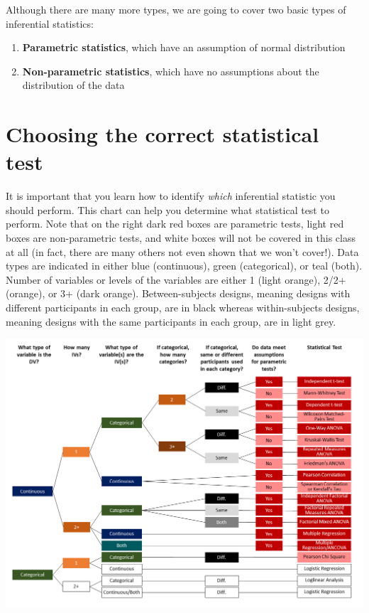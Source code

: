 \documentclass[
]{book}
\providecommand{\tightlist}{%
  \setlength{\itemsep}{0pt}\setlength{\parskip}{0pt}}
\begin{document}
Although there are many more types, we are going to cover two basic types of inferential statistics:

\begin{enumerate}
\def\labelenumi{\arabic{enumi}.}
\tightlist
\item
  \textbf{Parametric statistics}, which have an assumption of normal distribution
\item
  \textbf{Non-parametric statistics}, which have no assumptions about the distribution of the data
\end{enumerate}

\hypertarget{choosing-the-correct-statistical-test}{%
\section{Choosing the correct statistical test}\label{choosing-the-correct-statistical-test}}

It is important that you learn how to identify \emph{which} inferential statistic you should perform. This chart can help you determine what statistical test to perform. Note that on the right dark red boxes are parametric tests, light red boxes are non-parametric tests, and white boxes will not be covered in this class at all (in fact, there are many others not even shown that we won't cover!). Data types are indicated in either blue (continuous), green (categorical), or teal (both). Number of variables or levels of the variables are either 1 (light orange), 2/2+ (orange), or 3+ (dark orange). Between-subjects designs, meaning designs with different participants in each group, are in black whereas within-subjects designs, meaning designs with the same participants in each group, are in light grey.

\includegraphics{images/Statistical Choices.png}
\end{document}
